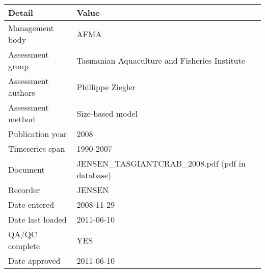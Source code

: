 \begin{table}[htb]
\centering
\begin{tabular}{lp{7cm}}
\toprule
Detail & Value \\
\midrule
Management body    & AFMA                                             \\
Assessment group   & Tasmanian Aquaculture and Fisheries Institute    \\
Assessment authors & Phillippe Ziegler                                \\
Assessment method  & Size-based model                                 \\
Publication year   & 2008                                             \\
Timeseries span    & 1990-2007                                        \\
Document           & JENSEN\_TASGIANTCRAB\_2008.pdf (pdf in database) \\
Recorder           & JENSEN                                           \\
Date entered       & 2008-11-29                                       \\
Date last loaded   & 2011-06-10                                       \\
QA/QC complete     & YES                                              \\
Date approved      & 2011-06-10                                       \\
\bottomrule
\end{tabular}
\label{tab:assessdet}
\end{table}
